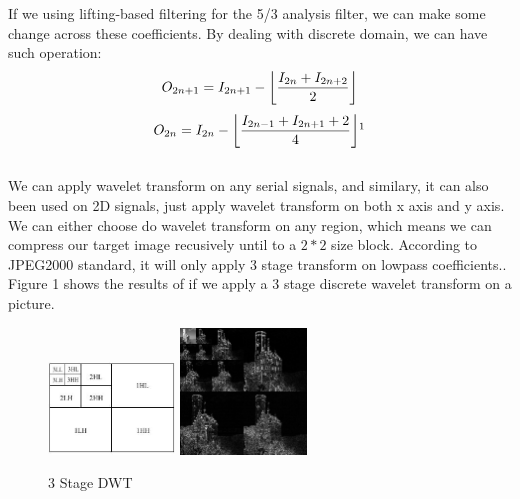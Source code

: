 \documentclass[UTF8, letterpaper, 14pt]{article}
\DeclarePairedDelimiter\floor{\lfloor}{\rfloor}
\begin{document}
If we using lifting-based filtering for the 5/3 analysis filter, we can make some change across these coefficients. By dealing with discrete domain, we can have such operation\cite{jpeg2koverview}:
\[
O_{2n+1} = I_{2n+1} - \floor*{\frac{I_{2n}+I_{2n+2}}{2}} 
\]
\[
O_{2n} = I_{2n} - \floor*{\frac{I_{2n-1}+I_{2n+1}+2}{4}}\footnotemark[1]
\]
\\
We can apply wavelet transform on any serial signals, and similary, it can also been used on 2D signals, just apply wavelet transform on both x axis and y axis. We can either choose do wavelet transform on any region, which means we can compress our target image recusively until to a $2*2$ size block. According to JPEG2000 standard, it will only apply 3 stage transform on lowpass coefficients.\cite{jpeg2kwiki}. Figure 1 shows the results of if we apply a 3 stage discrete wavelet transform on a picture.
\begin{figure}
\begin{center}
\includegraphics[width=0.3\textwidth, height=0.3\textwidth]{3stage_1}
\includegraphics[width=0.3\textwidth]{3stage_2}
\caption[12pt]{3 Stage DWT \cite{jpeg2koverview}} \label{tab:title} 
\end{center}
\end{figure}
\end{document}
